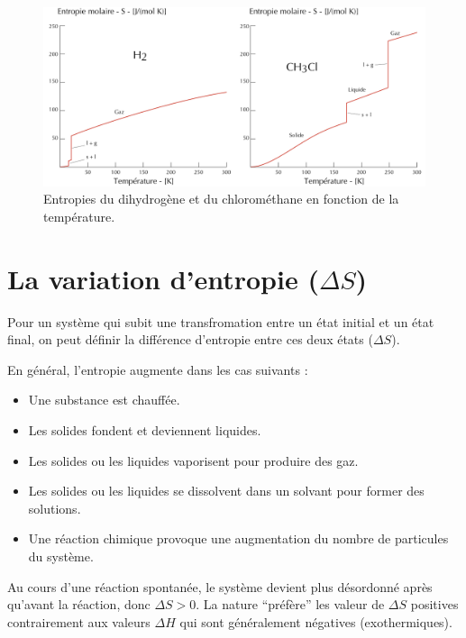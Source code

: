 \documentclass[
  11pt,
  a4paper,
  openany]{book}
\providecommand{\tightlist}{%
  \setlength{\itemsep}{0pt}\setlength{\parskip}{0pt}}
\begin{document}
\begin{figure}

{\centering \includegraphics[width=0.9\linewidth]{images/entropie-graph} 

}

\caption{Entropies du dihydrogène et du chlorométhane en fonction de la température.}\label{fig:entropie-graph}
\end{figure}

\section{\texorpdfstring{La variation d'entropie (\(\Delta S\))}{La variation d'entropie (\textbackslash Delta S)}}\label{la-variation-dentropie-delta-s}

Pour un système qui subit une transfromation entre un état initial et un état final, on peut définir la différence d'entropie entre ces deux états (\(\Delta S\)).

En général, l'entropie augmente dans les cas suivants :

\begin{itemize}
\tightlist
\item
  Une substance est chauffée.
\item
  Les solides fondent et deviennent liquides.
\item
  Les solides ou les liquides vaporisent pour produire des gaz.
\item
  Les solides ou les liquides se dissolvent dans un solvant pour former des solutions.
\item
  Une réaction chimique provoque une augmentation du nombre de particules du système.
\end{itemize}

Au cours d'une réaction spontanée, le système devient plus désordonné après qu'avant la réaction, donc \(\Delta S > 0\). La nature ``préfère'' les valeur de \(\Delta S\) positives contrairement aux valeurs \(\Delta H\) qui sont généralement négatives (exothermiques).
\end{document}
